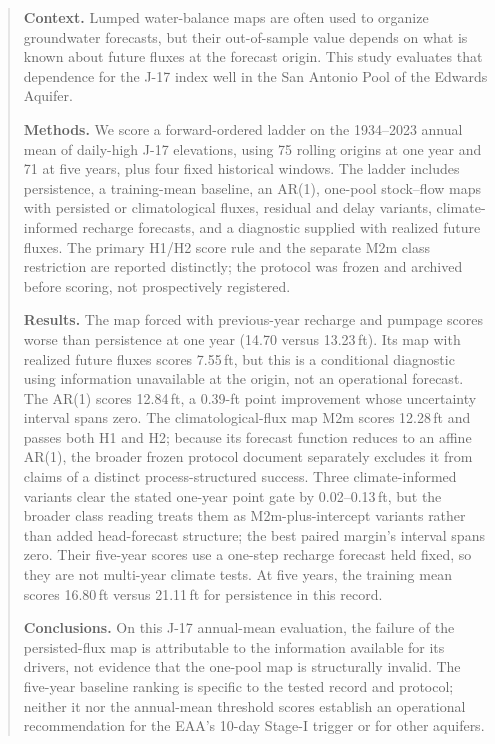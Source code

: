 \documentclass[11pt]{article}
\begin{document}
\begin{abstract}
\textbf{Context.} Lumped water-balance maps are often used to organize groundwater forecasts, but their out-of-sample value depends on what is known about future fluxes at the forecast origin. This study evaluates that dependence for the J-17 index well in the San Antonio Pool of the Edwards Aquifer.

\textbf{Methods.} We score a forward-ordered ladder on the 1934--2023 annual mean of daily-high J-17 elevations, using 75 rolling origins at one year and 71 at five years, plus four fixed historical windows. The ladder includes persistence, a training-mean baseline, an AR(1), one-pool stock--flow maps with persisted or climatological fluxes, residual and delay variants, climate-informed recharge forecasts, and a diagnostic supplied with realized future fluxes. The primary H1/H2 score rule and the separate M2m class restriction are reported distinctly; the protocol was frozen and archived before scoring, not prospectively registered.

\textbf{Results.} The map forced with previous-year recharge and pumpage scores worse than persistence at one year (14.70 versus 13.23\,ft). Its map with realized future fluxes scores 7.55\,ft, but this is a conditional diagnostic using information unavailable at the origin, not an operational forecast. The AR(1) scores 12.84\,ft, a 0.39-ft point improvement whose uncertainty interval spans zero. The climatological-flux map M2m scores 12.28\,ft and passes both H1 and H2; because its forecast function reduces to an affine AR(1), the broader frozen protocol document separately excludes it from claims of a distinct process-structured success. Three climate-informed variants clear the stated one-year point gate by 0.02--0.13\,ft, but the broader class reading treats them as M2m-plus-intercept variants rather than added head-forecast structure; the best paired margin's interval spans zero. Their five-year scores use a one-step recharge forecast held fixed, so they are not multi-year climate tests. At five years, the training mean scores 16.80\,ft versus 21.11\,ft for persistence in this record.

\textbf{Conclusions.} On this J-17 annual-mean evaluation, the failure of the persisted-flux map is attributable to the information available for its drivers, not evidence that the one-pool map is structurally invalid. The five-year baseline ranking is specific to the tested record and protocol; neither it nor the annual-mean threshold scores establish an operational recommendation for the EAA's 10-day Stage-I trigger or for other aquifers.
\end{abstract}
\end{document}
